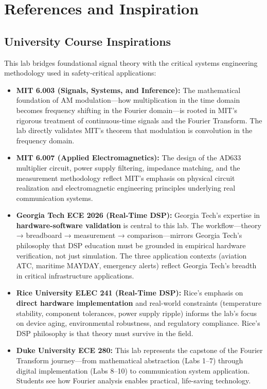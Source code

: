 \documentclass[11pt,letterpaper]{article}
\begin{document}
\clearpage

\section*{References and Inspiration}

\subsection*{University Course Inspirations}

This lab bridges foundational signal theory with the critical systems engineering methodology used in safety-critical applications:

\begin{itemize}
    \item \textbf{MIT 6.003 (Signals, Systems, and Inference):} The mathematical foundation of AM modulation—how multiplication in the time domain becomes frequency shifting in the Fourier domain—is rooted in MIT's rigorous treatment of continuous-time signals and the Fourier Transform. The lab directly validates MIT's theorem that modulation is convolution in the frequency domain.

    \item \textbf{MIT 6.007 (Applied Electromagnetics):} The design of the AD633 multiplier circuit, power supply filtering, impedance matching, and the measurement methodology reflect MIT's emphasis on physical circuit realization and electromagnetic engineering principles underlying real communication systems.

    \item \textbf{Georgia Tech ECE 2026 (Real-Time DSP):} Georgia Tech's expertise in \textbf{hardware-software validation} is central to this lab. The workflow—theory → breadboard → measurement → comparison—mirrors Georgia Tech's philosophy that DSP education must be grounded in empirical hardware verification, not just simulation. The three application contexts (aviation ATC, maritime MAYDAY, emergency alerts) reflect Georgia Tech's breadth in critical infrastructure applications.

    \item \textbf{Rice University ELEC 241 (Real-Time DSP):} Rice's emphasis on \textbf{direct hardware implementation} and real-world constraints (temperature stability, component tolerances, power supply ripple) informs the lab's focus on device aging, environmental robustness, and regulatory compliance. Rice's DSP philosophy is that theory must survive in the field.

    \item \textbf{Duke University ECE 280:} This lab represents the capstone of the Fourier Transform journey—from mathematical abstraction (Labs 1--7) through digital implementation (Labs 8--10) to communication system application. Students see how Fourier analysis enables practical, life-saving technology.
\end{itemize}
\end{document}
